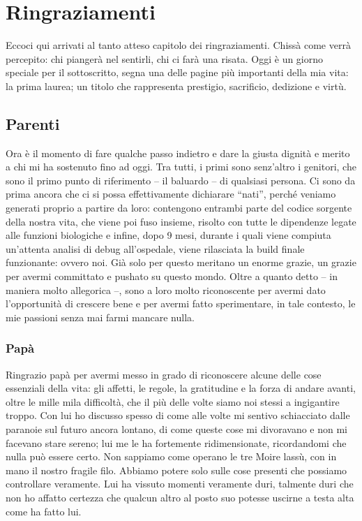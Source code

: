 \cleardoublepage
{}
{}
\chapter*{Ringraziamenti}

Eccoci qui arrivati al tanto atteso capitolo dei ringraziamenti.
Chissà come verrà percepito: chi piangerà nel sentirli, chi ci farà una
risata. Oggi è un giorno speciale per il sottoscritto, segna una delle
pagine più importanti della mia vita: la prima laurea; un titolo che
rappresenta prestigio, sacrificio, dedizione e virtù.

\section{Parenti}
Ora è il momento di fare qualche passo indietro e dare la giusta
dignità e merito a chi mi ha sostenuto fino ad oggi. Tra tutti, i primi
sono senz'altro i genitori, che sono il primo punto di riferimento --
il baluardo -- di qualsiasi persona. Ci sono da prima ancora che ci si
possa effettivamente dichiarare ``nati'', perché veniamo generati
proprio a partire da loro: contengono entrambi parte del codice
sorgente della nostra vita, che viene poi fuso insieme, risolto con
tutte le dipendenze legate alle funzioni biologiche e infine, dopo 9
mesi, durante i quali viene compiuta un'attenta analisi di debug
all'ospedale, viene rilasciata la build finale funzionante: ovvero noi.
Già solo per questo meritano un enorme grazie, un grazie per avermi
committato e pushato su questo mondo. Oltre a quanto detto -- in
maniera molto allegorica --, sono a loro molto riconoscente per avermi
dato l'opportunità di crescere bene e per avermi fatto sperimentare, in
tale contesto, le mie passioni senza mai farmi mancare nulla.

\subsection{Pap\`a}
Ringrazio papà per avermi messo in grado di riconoscere alcune delle
cose essenziali della vita: gli affetti, le regole, la gratitudine e la
forza di andare avanti, oltre le mille mila difficoltà, che il più
delle volte siamo noi stessi a ingigantire troppo. Con lui ho discusso
spesso di come alle volte mi sentivo schiacciato dalle paranoie sul
futuro ancora lontano, di come queste cose mi divoravano e non mi
facevano stare sereno; lui me le ha fortemente ridimensionate,
ricordandomi che nulla può essere certo. Non sappiamo come operano le
tre Moire lassù, con in mano il nostro fragile filo. Abbiamo potere
solo sulle cose presenti che possiamo controllare veramente. Lui ha
vissuto momenti veramente duri, talmente duri che non ho affatto
certezza che qualcun altro al posto suo potesse uscirne a testa alta
come ha fatto lui.

